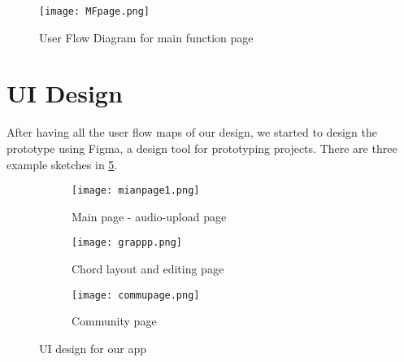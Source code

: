 \documentclass[11pt]{article}
\begin{document}
\begin{figure}[ht]
\centering
\texttt{[image: MFpage.png]}
\caption{User Flow Diagram for main function page}
\label{flowchartmain}
\end{figure}
\section{UI Design}
After having all the user flow maps of our design, we started to design the prototype using Figma, a design tool for prototyping projects. 
There are three example sketches in \cref{fig:UIdesign}. 

\begin{figure}[ht]
     \centering
     \hspace{16mm}
     \begin{subfigure}[b]{0.2\textwidth}
         \centering
         \texttt{[image: mianpage1.png]}
         \caption{Main page - audio-upload page}
         \label{Mainpage}
     \end{subfigure}
     \hfill
     \begin{subfigure}[b]{0.2\textwidth}
         \centering
         \texttt{[image: grappp.png]}
         \caption{Chord layout and editing page}
         \label{chordedit}
     \end{subfigure}
     \hfill
     \begin{subfigure}[b]{0.2\textwidth}
         \centering
         \texttt{[image: commupage.png]}
         \caption{Community page}
         \label{Community page}
     \end{subfigure}
     \hspace{16mm}
        \caption{UI design for our app}
        \label{fig:UIdesign}
\end{figure}
\end{document}
